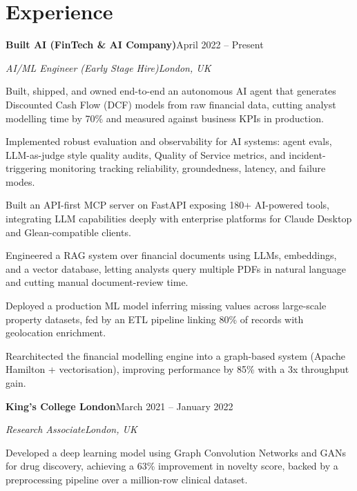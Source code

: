 \documentclass[10pt,a4paper]{article}
\newcommand{\entry}[4]{%
  {\color{company}\bfseries #1}\hfill {\color{muted}#2}\par
  \vspace{1pt}
  {\itshape #3}\hfill {\color{muted}\itshape #4}\par
  \vspace{3pt}%
}
\begin{document}
\section{Experience}
\entry{Built AI (FinTech \& AI Company)}{April 2022 -- Present}{AI/ML Engineer (Early Stage Hire)}{London, UK}
\begin{tight}
  \item Built, shipped, and owned end-to-end an autonomous AI agent that generates Discounted Cash Flow (DCF) models from raw financial data, cutting analyst modelling time by 70\% and measured against business KPIs in production.
  \item Implemented robust evaluation and observability for AI systems: agent evals, LLM-as-judge style quality audits, Quality of Service metrics, and incident-triggering monitoring tracking reliability, groundedness, latency, and failure modes.
  \item Built an API-first MCP server on FastAPI exposing 180+ AI-powered tools, integrating LLM capabilities deeply with enterprise platforms for Claude Desktop and Glean-compatible clients.
  \item Engineered a RAG system over financial documents using LLMs, embeddings, and a vector database, letting analysts query multiple PDFs in natural language and cutting manual document-review time.
  \item Deployed a production ML model inferring missing values across large-scale property datasets, fed by an ETL pipeline linking 80\% of records with geolocation enrichment.
  \item Rearchitected the financial modelling engine into a graph-based system (Apache Hamilton + vectorisation), improving performance by 85\% with a 3x throughput gain.
\end{tight}

\entry{King's College London}{March 2021 -- January 2022}{Research Associate}{London, UK}
\begin{tight}
  \item Developed a deep learning model using Graph Convolution Networks and GANs for drug discovery, achieving a 63\% improvement in novelty score, backed by a preprocessing pipeline over a million-row clinical dataset.
\end{tight}

\end{document}
